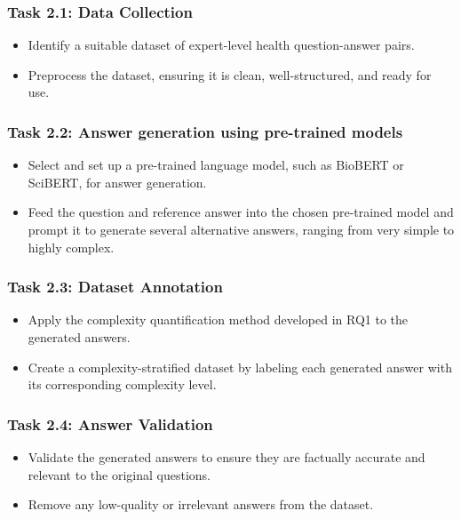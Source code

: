 \subsubsection*{Task 2.1: Data Collection}

\begin{itemize}
    \item Identify a suitable dataset of expert-level health question-answer pairs.
    \item Preprocess the dataset, ensuring it is clean, well-structured, and ready for use.
\end{itemize}

\subsubsection*{Task 2.2: Answer generation using pre-trained models}

\begin{itemize}
    \item Select and set up a pre-trained language model, such as BioBERT or SciBERT, for answer generation.
    \item Feed the question and reference answer into the chosen pre-trained model and prompt it to generate several alternative answers, ranging from very simple to highly complex.
\end{itemize}

\subsubsection*{Task 2.3: Dataset Annotation}

\begin{itemize}
    \item Apply the complexity quantification method developed in RQ1 to the generated answers.
    \item Create a complexity-stratified dataset by labeling each generated answer with its corresponding complexity level.
\end{itemize}

\subsubsection*{Task 2.4: Answer Validation}

\begin{itemize}
    \item Validate the generated answers to ensure they are factually accurate and relevant to the original questions.
    \item Remove any low-quality or irrelevant answers from the dataset.
\end{itemize}

